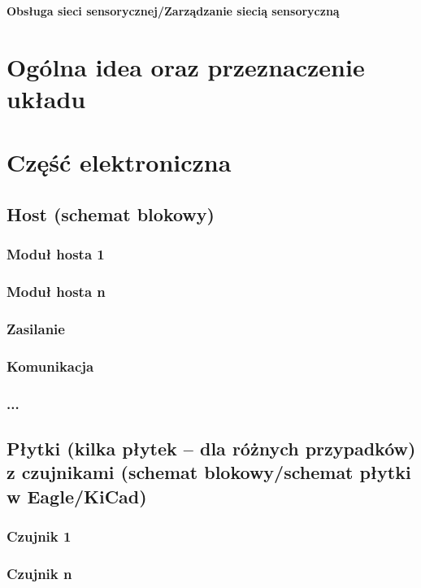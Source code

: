 


	
	\begin{center}
		\Large\textbf{Obsługa sieci sensorycznej/Zarządzanie siecią sensoryczną}
	\end{center}
	
	
	\tableofcontents
	
	
	
	\newpage
	\section{Ogólna idea oraz przeznaczenie układu}
	
	\section{Część elektroniczna}
		\subsection{Host (schemat blokowy)}
			\subsubsection{Moduł hosta 1}
			\subsubsection{Moduł hosta n}
			\subsubsection{Zasilanie}
			\subsubsection{Komunikacja}
			\subsubsection{...}
		
		\subsection{Płytki (\footnotesize{kilka płytek -- dla różnych przypadków) z czujnikami (schemat blokowy/schemat płytki w Eagle/KiCad)}}
			\subsubsection{Czujnik 1} 
			\subsubsection{Czujnik n}
